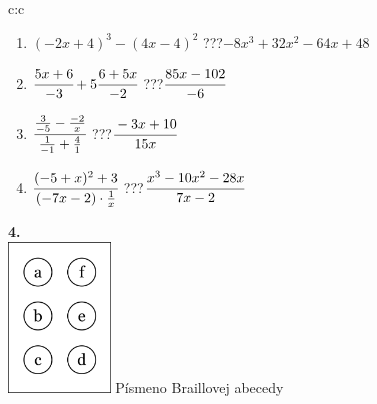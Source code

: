 \documentclass[10pt]{report}
\begin{document}
\begin{tabular}{c:c}
\begin{minipage}[c][104.5mm][t]{0.5\linewidth}
\begin{center}
\begin{minipage}{0.79\linewidth}
\begin{center}
\begin{varwidth}{\linewidth}
\begin{enumerate}
\item $(-2x+4)^3-(4x-4)^2$\quad \dotfill\; ???\;\dotfill \quad $-8x^3+32x^2-64x+48$
\item $\cfrac{5x+6}{-3}+5\cfrac{6+5x}{-2}$\quad \dotfill\; ???\;\dotfill \quad $\cfrac{85x-102}{-6}$
\item $\cfrac{\frac{3}{-5}-\frac{-2}{x}}{\frac{1}{-1}+\frac{4}{1}}$\quad \dotfill\; ???\;\dotfill \quad $\cfrac{-3x+10}{15x}$
\item $\cfrac{(-5+x)^2+3}{(-7x-2)\cdot\frac{1}{x}}$\quad \dotfill\; ???\;\dotfill \quad $\cfrac{x^3-10x^2-28x}{7x-2}$
\end{enumerate}
\end{varwidth}
\end{center}
\end{minipage}
\begin{minipage}{0.20\linewidth}
\begin{center}
{\Huge\bfseries 4.} \\[2mm]
\includegraphics[height=40mm]{../images/braille.png}
{\small Písmeno Braillovej abecedy}
\end{center}
\end{minipage}
\end{center}
\end{minipage}
%
\end{tabular}
\newpage
\thispagestyle{empty}
\end{document}
